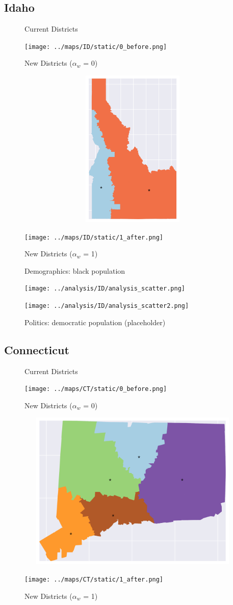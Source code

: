 \subsection{Idaho}
\begin{figure}[htb!] \centering
\caption{ Current Districts }
\texttt{[image: ../maps/ID/static/0\_before.png]}
\caption{ New Districts ($\alpha_w$ = 0) }
\includegraphics[width=5in,height=3in,keepaspectratio]{../maps/ID/static/0_after.png}
\caption{ New Districts ($\alpha_w$ = 1) }
\texttt{[image: ../maps/ID/static/1\_after.png]}
\end{figure}

\clearpage
\newpage

\begin{figure}[htb!] \centering
\caption{ Demographics: black population }
\texttt{[image: ../analysis/ID/analysis\_scatter.png]}
\caption{ Politics: democratic population (placeholder)}
\texttt{[image: ../analysis/ID/analysis\_scatter2.png]}
\end{figure}

\clearpage
\newpage

\subsection{Connecticut}
\begin{figure}[htb!] \centering
\caption{ Current Districts }
\texttt{[image: ../maps/CT/static/0\_before.png]}
\caption{ New Districts ($\alpha_w$ = 0) }
\includegraphics[width=5in,height=3in,keepaspectratio]{../maps/CT/static/0_after.png}
\caption{ New Districts ($\alpha_w$ = 1) }
\texttt{[image: ../maps/CT/static/1\_after.png]}
\end{figure}

